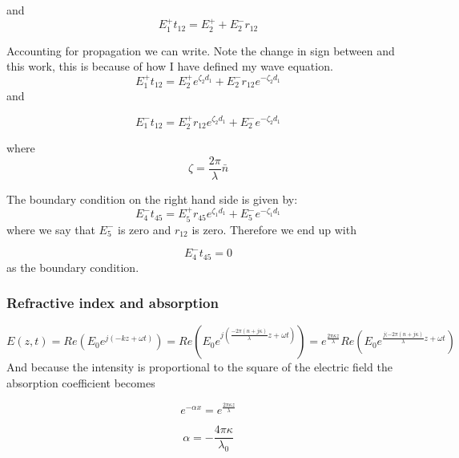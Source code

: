 \documentclass[11pt]{article}
\begin{document}
and
\begin{equation}
E_{1}^{+}t_{12}=E_{2}^{+}+E_{2}^{-}r_{12}
\end{equation}

Accounting for propagation we can write.  Note the change in sign between \cite{10.1063/1.1534621} and this work, this is because of how I have defined my wave equation. 
\begin{equation}
E_{1}^{+}t_{12}=E_{2}^{+}e^{\zeta_2 d_1}+E_{2}^{-}r_{12}e^{-\zeta_2 d_1}
\end{equation}
and

\begin{equation}
E_{1}^{-}t_{12}=E_{2}^{+}r_{12}e^{\zeta_2 d_1}+E_{2}^{-}e^{-\zeta_2 d_1}
\end{equation}

where
\begin{equation}
\zeta=\frac{2\pi}{\lambda} \bar{n}
\end{equation}



The boundary condition on the right hand side is given by:
\begin{equation}
E_{4}^{-}t_{45}=E_{5}^{+}r_{45}e^{\zeta_1 d_1}+E_{5}^{-}e^{-\zeta_1 d_1}
\end{equation}
where we say that $E_{5}^{-}$ is zero and $r_{12}$ is zero.  Therefore we end up with

\begin{equation}
E_{4}^{-}t_{45}=0
\end{equation}
as the boundary condition.

\subsubsection{Refractive index and absorption}
\begin{equation}
E(z,t)=Re(E_0 e^{j(-kz+\omega t)})= Re(E_0 e^{j(\frac{-2 \pi (n+j\kappa)}{\lambda}z + \omega t)})=e^{\frac{2\pi\kappa z}{\lambda}}Re(E_0 e^{\frac{j(-2 \pi (n+j\kappa)}{\lambda}z +\omega t})
\end{equation}
And because the intensity is proportional to the square of the electric field the absorption coefficient becomes

\begin{equation}
e^{-\alpha x}=e^{\frac{2\pi\kappa z}{\lambda}}
\end{equation}

\begin{equation}
\alpha=-\frac{4\pi\kappa}{\lambda_0}
\end{equation}
\end{document}
